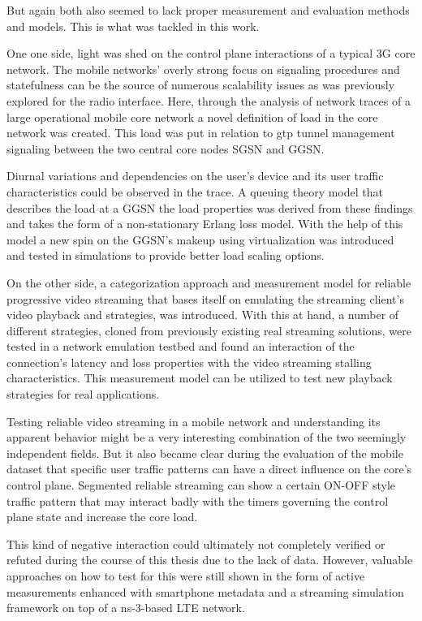 But again both also seemed to lack proper measurement and evaluation methods and models. This is what was tackled in this work.

One one side, light was shed on the control plane interactions of a typical \gls{3G} core network. The mobile networks' overly strong focus on signaling procedures and statefulness can be the source of numerous scalability issues as was previously explored for the radio interface. Here, through the analysis of network traces of a large operational mobile core network a novel definition of load in the core network was created. This load was put in relation to \gls{gtp} tunnel management signaling between the two central core nodes \gls{SGSN} and \gls{GGSN}. 

Diurnal variations and dependencies on the user's device and its user traffic characteristics could be observed in the trace. A queuing theory model that describes the load at a \gls{GGSN} the load properties was derived from these findings and takes the form of a non-stationary Erlang loss model. With the help of this model a new spin on the \gls{GGSN}'s makeup using virtualization was introduced and tested in simulations to provide better load scaling options.

On the other side, a categorization approach and measurement model for reliable progressive video streaming that bases itself on emulating the streaming client's video playback and strategies, was introduced. With this at hand, a number of different strategies, cloned from previously existing real streaming solutions, were tested in a network emulation testbed and found an interaction of the connection's latency and loss properties with the video streaming stalling characteristics. This measurement model can be utilized to test new playback strategies for real applications.

Testing reliable video streaming in a mobile network and understanding its apparent behavior might be a very interesting combination of the two seemingly independent fields. But it also became clear during the evaluation of the mobile dataset that specific user traffic patterns can have a direct influence on the core's control plane. Segmented reliable streaming can show a certain ON-OFF style traffic pattern that may interact badly with the timers governing the control plane state and increase the core load.

This kind of negative interaction could ultimately not completely verified or refuted during the course of this thesis due to the lack of data. However, valuable approaches on how to test for this were still shown in the form of active measurements enhanced with smartphone metadata and a streaming simulation framework on top of a ns-3-based \gls{LTE} network.

